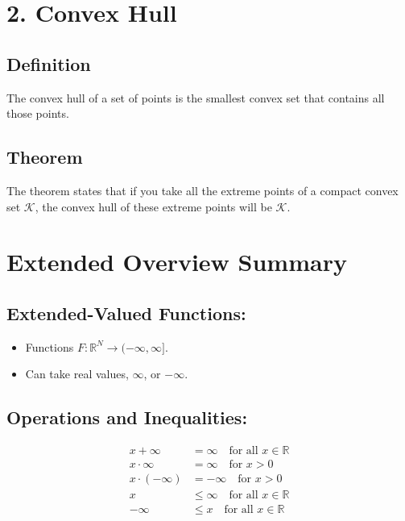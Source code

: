 \documentclass{article}
\begin{document}
\section*{2. Convex Hull}

\subsection*{Definition}
The convex hull of a set of points is the smallest convex set that contains all those points.

\subsection*{Theorem}
The theorem states that if you take all the extreme points of a compact convex set \( \mathcal{K} \), the convex hull of these extreme points will be \( \mathcal{K} \).












\section*{Extended Overview Summary}

\subsection*{Extended-Valued Functions:}

\begin{itemize}
    \item Functions $F : \mathbb{R}^N \to (-\infty, \infty]$.
    \item Can take real values, $\infty$, or $-\infty$.
\end{itemize}

\subsection*{Operations and Inequalities:}

\begin{align*}
    x + \infty & = \infty \quad \text{for all } x \in \mathbb{R} \\
    x \cdot \infty & = \infty \quad \text{for } x > 0 \\
    x \cdot (-\infty) & = -\infty \quad \text{for } x > 0 \\
    x & \leq \infty \quad \text{for all } x \in \mathbb{R} \\
    -\infty & \leq x \quad \text{for all } x \in \mathbb{R}
\end{align*}
\end{document}
